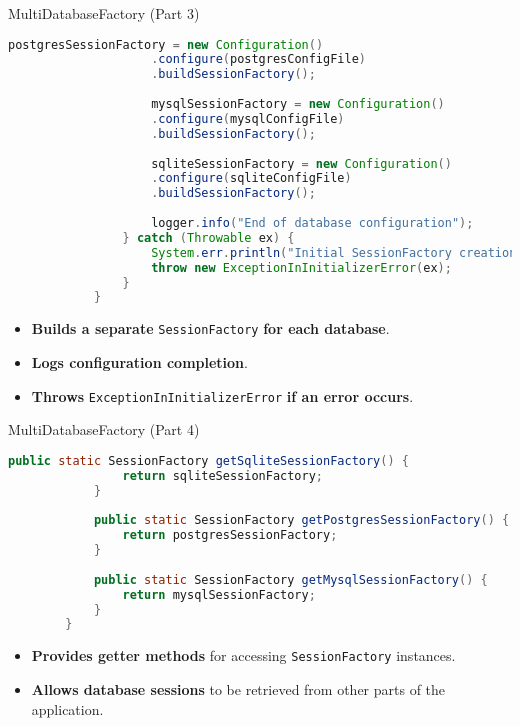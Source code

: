 \documentclass[aspectratio=169, table]{beamer}
\begin{document}
			\begin{frame}[fragile]{MultiDatabaseFactory (Part 3)}
				\vspace{20pt}
				\begin{lstlisting}[language=Java, style=JavaStyle, firstnumber=25]
					postgresSessionFactory = new Configuration()
					.configure(postgresConfigFile)
					.buildSessionFactory();
					
					mysqlSessionFactory = new Configuration()
					.configure(mysqlConfigFile)
					.buildSessionFactory();
					
					sqliteSessionFactory = new Configuration()
					.configure(sqliteConfigFile)
					.buildSessionFactory();
					
					logger.info("End of database configuration");
				} catch (Throwable ex) {
					System.err.println("Initial SessionFactory creation failed: " + ex);
					throw new ExceptionInInitializerError(ex);
				}
			}
		\end{lstlisting}

		\begin{itemize}
			\item \textbf{Builds a separate} \texttt{SessionFactory} \textbf{for each database}.
			\item \textbf{Logs configuration completion}.
			\item \textbf{Throws} \texttt{ExceptionInInitializerError} \textbf{if an error occurs}.
		\end{itemize}
	\end{frame}
	
	\begin{frame}[fragile]{MultiDatabaseFactory (Part 4)}
		\vspace{20pt}
		\begin{lstlisting}[language=Java, style=JavaStyle, firstnumber=40]
			public static SessionFactory getSqliteSessionFactory() {
				return sqliteSessionFactory;
			}
			
			public static SessionFactory getPostgresSessionFactory() {
				return postgresSessionFactory;
			}
			
			public static SessionFactory getMysqlSessionFactory() {
				return mysqlSessionFactory;
			}
		}
	\end{lstlisting}

	\begin{itemize}
		\item \textbf{Provides getter methods} for accessing \texttt{SessionFactory} instances.
		\item \textbf{Allows database sessions} to be retrieved from other parts of the application.
	\end{itemize}
\end{frame}
\end{document}
